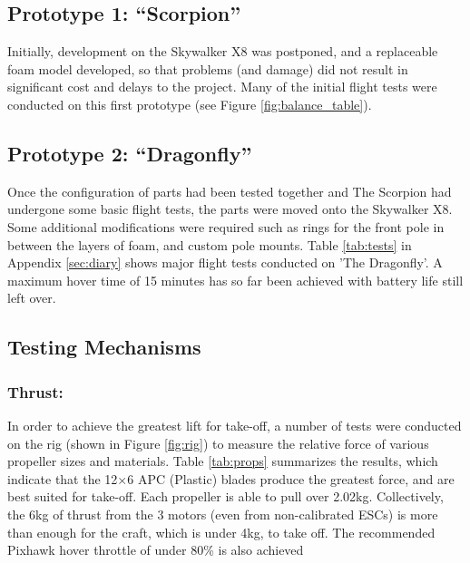 
\subsection{Prototype 1: ``Scorpion''}
Initially, development on the Skywalker X8 was postponed, and a replaceable foam model developed, so that problems (and damage) did not result in significant cost and delays to the project. Many of the initial flight tests were conducted on this first prototype (see Figure \ref{fig:balance_table}).

\subsection{Prototype 2: ``Dragonfly''}
Once the configuration of parts had been tested together and The Scorpion had undergone some basic flight tests, the parts were moved onto the Skywalker X8. Some additional modifications were required such as rings for the front pole in between the layers of foam, and custom pole mounts. Table \ref{tab:tests} in Appendix \ref{sec:diary} shows major flight tests conducted on 'The Dragonfly'. A maximum hover time of 15 minutes has so far been achieved with battery life still left over.  

\subsection{Testing Mechanisms}
\subsubsection*{Thrust:} In order to achieve the greatest lift for take-off, a number of tests were conducted on the rig (shown in Figure \ref{fig:rig}) to measure the relative force of various propeller sizes and materials. Table \ref{tab:props} summarizes the results, which indicate that the 12$\times$6 APC (Plastic) blades produce the greatest force, and are best suited for take-off. Each propeller is able to pull over 2.02kg. Collectively, the 6kg of thrust from the 3 motors (even from non-calibrated ESCs) is more than enough for the craft, which is under 4kg, to take off. The recommended Pixhawk hover throttle of under 80\% is also achieved  

